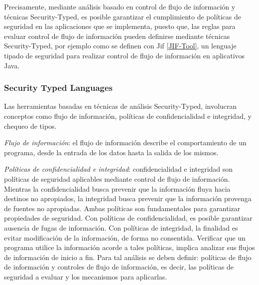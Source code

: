 Precisamente, mediante análisis basado en control de flujo de información y
técnicas Security-Typed, es posible garantizar el cumplimiento de políticas de
seguridad en las aplicaciones que se implementa, puesto que,
las reglas para evaluar control de flujo de
información pueden definirse mediante técnicas Security-Typed, por ejemplo como
se definen con Jif \ref{JIF-Tool}, un lenguaje tipado de seguridad para realizar
control de flujo de información en aplicativos Java.
% 
\subsubsection{Security Typed Languages}
Las herramientas basadas en técnicas de análisis Security-Typed, involucran
conceptos como flujo de información, políticas de confidencialidad e integridad,
y chequeo de tipos.

\emph{Flujo de información}: el flujo de información describe el
comportamiento de un programa, desde la entrada de los datos hasta la salida de
los mismos. 

\emph{Políticas de confidencialidad e integridad}: confidencialidad e integridad
son políticas de seguridad aplicables mediante control de flujo de información.
Mientras la confidencialidad busca prevenir que la información fluya hacia
destinos no apropiados, la integridad busca prevenir que la información provenga
de fuentes no apropiadas\cite{LanguageIFS-2013}.\newline
Ambas políticas son fundamentales para garantizar propiedades de
seguridad.\newline 
Con políticas de confidencialidad, es posible garantizar ausencia de fugas de
información. Con políticas de integridad, la finalidad es evitar
modificación de la información, de forma no consentida.\newline 
Verificar que un programa utilice la información acorde a
tales políticas, implica analizar sus flujos de información de inicio a fin.
Para tal análisis se deben definir: políticas de flujo de información y
controles de flujo de información, es decir, las políticas de seguridad a
evaluar y los mecanismos para aplicarlas. 

